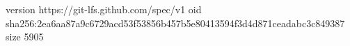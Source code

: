version https://git-lfs.github.com/spec/v1
oid sha256:2ea6aa87a9c6729acd53f53856b457b5e80413594f3d4d871ceadabc3c849387
size 5905
